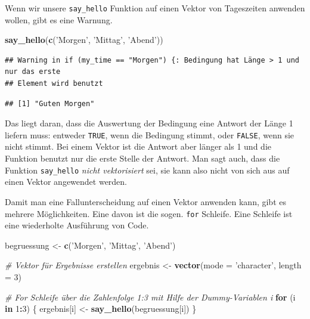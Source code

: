 \documentclass[]{book}
\newenvironment{Shaded}{\begin{snugshade}}{\end{snugshade}}
\newcommand{\CommentTok}[1]{\textcolor[rgb]{0.56,0.35,0.01}{\textit{#1}}}
\newcommand{\ControlFlowTok}[1]{\textcolor[rgb]{0.13,0.29,0.53}{\textbf{#1}}}
\newcommand{\DataTypeTok}[1]{\textcolor[rgb]{0.13,0.29,0.53}{#1}}
\newcommand{\DecValTok}[1]{\textcolor[rgb]{0.00,0.00,0.81}{#1}}
\newcommand{\KeywordTok}[1]{\textcolor[rgb]{0.13,0.29,0.53}{\textbf{#1}}}
\newcommand{\NormalTok}[1]{#1}
\newcommand{\OperatorTok}[1]{\textcolor[rgb]{0.81,0.36,0.00}{\textbf{#1}}}
\newcommand{\StringTok}[1]{\textcolor[rgb]{0.31,0.60,0.02}{#1}}
\begin{document}
Wenn wir unsere \texttt{say\_hello} Funktion auf einen Vektor von Tageszeiten anwenden wollen, gibt es eine Warnung.

\begin{Shaded}
\begin{Highlighting}[]
\KeywordTok{say_hello}\NormalTok{(}\KeywordTok{c}\NormalTok{(}\StringTok{'Morgen'}\NormalTok{, }\StringTok{'Mittag'}\NormalTok{, }\StringTok{'Abend'}\NormalTok{))}
\end{Highlighting}
\end{Shaded}

\begin{verbatim}
## Warning in if (my_time == "Morgen") {: Bedingung hat Länge > 1 und nur das erste
## Element wird benutzt
\end{verbatim}

\begin{verbatim}
## [1] "Guten Morgen"
\end{verbatim}

Das liegt daran, dass die Auswertung der Bedingung eine Antwort der Länge 1 liefern muss: entweder \texttt{TRUE}, wenn die Bedingung stimmt, oder \texttt{FALSE}, wenn sie nicht stimmt. Bei einem Vektor ist die Antwort aber länger als 1 und die Funktion benutzt nur die erste Stelle der Antwort. Man sagt auch, dass die Funktion \texttt{say\_hello} \emph{nicht vektorisiert} sei, sie kann also nicht von sich aus auf einen Vektor angewendet werden.

Damit man eine Fallunterscheidung auf einen Vektor anwenden kann, gibt es mehrere Möglichkeiten. Eine davon ist die sogen. \texttt{for} Schleife. Eine Schleife ist eine wiederholte Ausführung von Code.

\begin{Shaded}
\begin{Highlighting}[]
\NormalTok{begruessung <-}\StringTok{ }\KeywordTok{c}\NormalTok{(}\StringTok{'Morgen'}\NormalTok{, }\StringTok{'Mittag'}\NormalTok{, }\StringTok{'Abend'}\NormalTok{)}

\CommentTok{# Vektor für Ergebnisse erstellen}
\NormalTok{ergebnis <-}\StringTok{ }\KeywordTok{vector}\NormalTok{(}\DataTypeTok{mode =} \StringTok{'character'}\NormalTok{, }\DataTypeTok{length =} \DecValTok{3}\NormalTok{)}

\CommentTok{# For Schleife über die Zahlenfolge 1:3 mit Hilfe der Dummy-Variablen i}
\ControlFlowTok{for}\NormalTok{ (i }\ControlFlowTok{in} \DecValTok{1}\OperatorTok{:}\DecValTok{3}\NormalTok{) \{}
\NormalTok{  ergebnis[i] <-}\StringTok{ }\KeywordTok{say_hello}\NormalTok{(begruessung[i])}
\NormalTok{\}}
\end{Highlighting}
\end{Shaded}
\end{document}
